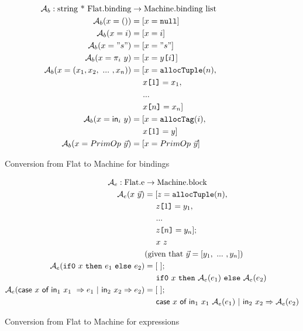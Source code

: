 \documentclass{article}
\theoremstyle{definition}
\theoremstyle{remark}
\numberwithin{equation}{section}
\begin{document}
\begin{figure}[!ht]
  \centering
\begin{align*}
\mathcal{A}_b : \textrm{string * Flat.binding} &\to \textrm{Machine.binding list}\\ %
\mathcal{A}_b(x=()) & = [x=\texttt{null}]\\ %
\mathcal{A}_b(x=i) & = [x=i]\\ %
\mathcal{A}_b(x="s") & = [x="s"]\\ %
\mathcal{A}_b(x=\pi _i\ y) & = [x=y\texttt{[}i\texttt{]}]\\ %
\mathcal{A}_b(x=(x_1,x_2,\ ...\ , x_n)) & = [x=\texttt{allocTuple}(n),\\
    &\kern0.5cm x\texttt{[}1\texttt{]}=x_1,\\
    &\kern0.5cm...\\
    &\kern0.5cm x\texttt{[}n\texttt{]}=x_n]\\ %
\mathcal{A}_b(x=\textsf{in}_i\ y) & = [x=\texttt{allocTag}(i),\\
    &\kern0.5cm x\texttt{[}1\texttt{]}=y]\\ %
\mathcal{A}_b(x=PrimOp\ \vec{y}) & = [x=PrimOp\ \vec{y}] %
\end{align*}
  \caption{Conversion from Flat to Machine for bindings}
  \label{fig-sub}
\end{figure}

\begin{figure}[!ht]
  \centering
\begin{align*}
\mathcal{A}_e : \textrm{Flat.e} &\to \textrm{Machine.block}\\ %
\mathcal{A}_e(x\ \vec{y}) & = [z=\texttt{allocTuple}(n),\\
    & \kern0.5cm z\texttt{[}1\texttt{]}=y_1,\\
    & \kern0.5cm ...\\
    & \kern0.5cm z\texttt{[}n\texttt{]}=y_n];\\
    & \kern0.5cm x\ z \\%
    &(\textrm{given that}\ \vec{y}=[y_1,\ ...\ , y_n])\\
\mathcal{A}_e(\texttt{if0}\ x\ \texttt{then}\ e_1\ \texttt{else}\ e_2) & = [\ ];\\
    & \kern0.5cm \texttt{if0}\ x\ \texttt{then}\ \mathcal{A}_e(e_1)
        \ \texttt{else}\ \mathcal{A}_e(e_2) \\   %
\mathcal{A}_e(\textsf{case}\ x\ \textsf{of in}_1\ x_1\ \Rightarrow e_1
                    \ |\ \textsf{in}_2\ x_2 \Rightarrow e_2)
    & = [\ ];\\
    & \kern0.5cm \textsf{case}\ x\ \textsf{of in}_1\ x_1\ \mathcal{A}_e(e_1)
         \ |\ \textsf{in}_2\ x_2 \Rightarrow \mathcal{A}_e(e_2)  %
\end{align*}
  \caption{Conversion from Flat to Machine for expressions}
  \label{fig-sub}
\end{figure}
\end{document}
